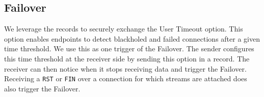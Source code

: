 %
%




\subsection{Failover}
\label{sec:prot-migration}

We leverage the \tcpls records to securely exchange the \tcp User Timeout option.
This option enables endpoints to detect blackholed and failed \tcp connections
after a given time threshold. We use this as one trigger of the Failover. The
sender configures this time threshold at the receiver side by sending this \tcp
option in a \tcpls record. The receiver can then notice when it stops receiving
data and trigger the Failover.
Receiving a \tcp \texttt{RST} or \texttt{FIN} over a \tcp connection for which
\tcpls streams are attached does also trigger the Failover.


